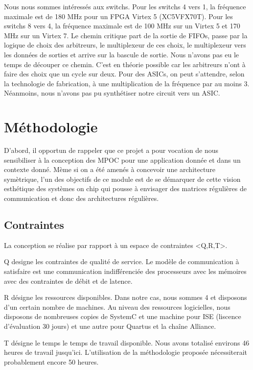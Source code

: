\documentclass[11pt]{article}
\begin{document}
Nous nous sommes intéressés aux switchs. Pour les switchs 4 vers 1, la fréquence maximale est de 180 MHz pour un FPGA Virtex 5 (XC5VFX70T). Pour les switchs 8 vers 4, la fréquence maximale est de 100 MHz sur un Virtex 5 et 170 MHz sur un Virtex 7. Le chemin critique part de la sortie de FIFOs, passe par la logique de choix des arbitreurs, le multiplexeur de ces choix, le multiplexeur vers les données de sorties et arrive sur la bascule de sortie. Nous n'avons pas eu le temps de découper ce chemin. C'est en théorie possible car les arbitreurs n'ont à faire des choix que un cycle sur deux. Pour des ASICs, on peut s'attendre, selon la technologie de fabrication, à une multiplication de la fréquence par au moins 3. Néanmoins, nous n'avons pas pu synthétiser notre circuit vers un ASIC.

\section{Méthodologie}

D'abord, il opportun de rappeler que ce projet a pour vocation de nous sensibiliser à la conception des MPOC pour une application donnée et dans un contexte donné. Mème si on a été amenés à concevoir une architecture symètrique, l'un des objectifs de ce module est de se démarquer de cette vision esthétique des systèmes on chip qui pousse à envisager des matrices régulières de communication et donc des architectures régulières.

\subsection{Contraintes}

La conception se réalise par rapport à un espace de contraintes <Q,R,T>.

Q designe les contraintes de qualité de service. Le modèle de communication à satisfaire est une communication indifférenciée des processeurs avec les mémoires avec des contraintes de débit et de latence.

R désigne les ressources disponibles. Dans notre cas, nous sommes 4 et disposons d'un certain nombre de machines. Au niveau des ressources logicielles, nous disposons de nombreuses copies de SystemC et une machine pour ISE (liscence d'évaluation 30 jours) et une autre pour Quartus et la chaîne Alliance.

T désigne le temps le temps de travail disponible. Nous avons totalisé environs 46 heures de travail jusqu'ici. L'utilisation de la méthodologie proposée nécessiterait probablement encore 50 heures.
\end{document}
